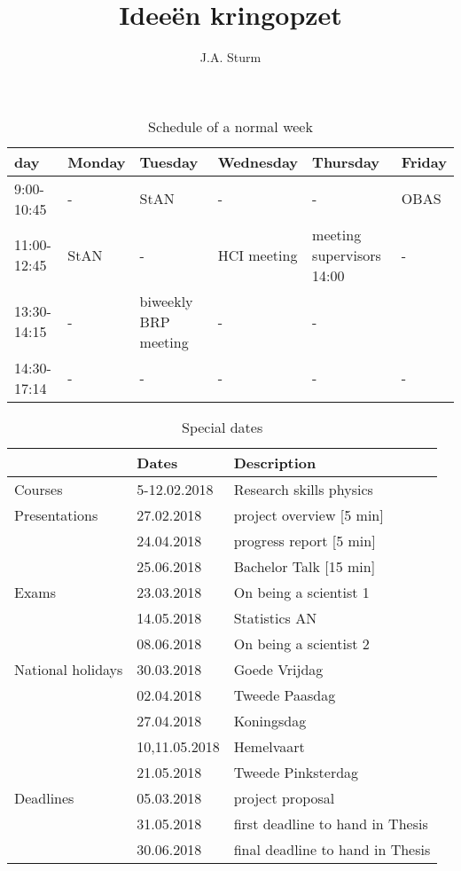 \documentclass[11pt]{article}
\title{\bf{Idee\"en kringopzet}}
\author{J.A. Sturm}
\numberwithin{figure}{section}
\begin{document}
\maketitle
{}

\begin{table}[ht]
\centering
\caption{Schedule of a normal week}
\begin{tabular}{l|l|l|l|l|l|}
day 		&\bf{Monday}& \bf{Tuesday}			& \bf{Wednesday}& \bf{Thursday} & \bf{Friday}\\
\hline
9:00-10:45	& -			& StAN 					& -				& -				& OBAS \\
\hline
11:00-12:45	& StAN 		& -						& HCI meeting	& meeting supervisors 14:00				& -\\
\hline
13:30-14:15 & -			& biweekly BRP meeting	& -				& -			& \\\hline
14:30-17:14 & - 		& - 					& - 			& - 			& - \\
\hline

\end{tabular}
\end{table}

\begin{table}[ht]
\centering
\caption{Special dates}
\begin{tabular}{l|l|l|}
						& \bf{Dates} 	& \bf{Description}\\\hline
Courses					& 5-12.02.2018	& Research skills physics\\
Presentations     		& 27.02.2018 	& project overview [5 min]\\
						& 24.04.2018	& progress report [5 min]\\
						& 25.06.2018	& Bachelor Talk [15 min]\\
Exams 					& 23.03.2018	& On being a scientist 1\\
						& 14.05.2018	& Statistics AN\\
						& 08.06.2018	& On being a scientist 2\\
National holidays		& 30.03.2018	& Goede Vrijdag\\
						& 02.04.2018	& Tweede Paasdag\\
						& 27.04.2018	& Koningsdag\\
						& 10,11.05.2018	& Hemelvaart\\
						& 21.05.2018	& Tweede Pinksterdag\\
Deadlines				& 05.03.2018	& project proposal \\
						& 31.05.2018	& first deadline to hand in Thesis\\
						& 30.06.2018	& final deadline to hand in Thesis\\\hline
\end{tabular}
\end{table}
\end{document}
